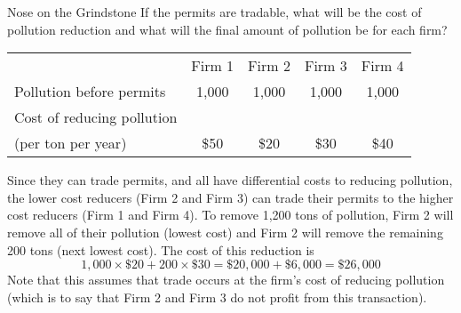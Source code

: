 \documentclass{beamer}
\begin{document}
\begin{frame}{Nose on the Grindstone}
    If the permits are tradable, what will be the cost of pollution reduction and what will the final amount of pollution be for each firm?
    \begin{table}[H]
    \centering
    \begin{tabular}{lcccc}
                                                  & Firm 1 & Firm 2 & Firm 3 & Firm 4 \\
    Pollution before permits                      & 1,000  & 1,000  & 1,000  & 1,000  \\ \hline
    Cost of reducing pollution \\(per ton per year) & \$50   & \$20   & \$30   & \$40  
    \end{tabular}
    \end{table}
    Since they can trade permits, and all have differential costs to reducing pollution, the lower cost reducers (Firm 2 and Firm 3) can trade their permits to the higher cost reducers (Firm 1 and Firm 4). To remove 1,200 tons of pollution, Firm 2 will remove all of their pollution (lowest cost) and Firm 2 will remove the remaining 200 tons (next lowest cost). The cost of this reduction is 
    \[1,000 \times \$20 + 200 \times \$30 = \$20,000 + \$6,000 = \$26,000\]
    Note that this assumes that trade occurs at the firm's cost of reducing pollution (which is to say that Firm 2 and Firm 3 do not profit from this transaction).
\end{frame}
\end{document}
